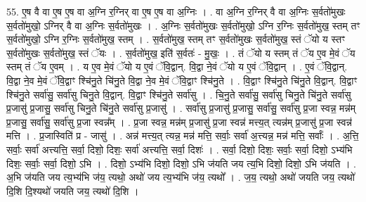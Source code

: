 \documentclass[17pt]{extarticle}
\begin{document}
55. ए॒ष वै वा ए॒ष ए॒ष वा अ॒ग्नि र॒ग्निर् वा ए॒ष ए॒ष वा अ॒ग्निः । . वा अ॒ग्नि र॒ग्निर् वै वा अ॒ग्निः स॒र्वतो॑मुखः स॒र्वतो॑मुखो॒ ऽग्निर् वै वा अ॒ग्निः स॒र्वतो॑मुखः । . अ॒ग्निः स॒र्वतो॑मुखः स॒र्वतो॑मुखो॒ ऽग्नि र॒ग्निः स॒र्वतो॑मुख॒ स्तम् तꣳ स॒र्वतो॑मुखो॒ ऽग्नि र॒ग्निः स॒र्वतो॑मुख॒ स्तम् । . स॒र्वतो॑मुख॒ स्तम् तꣳ स॒र्वतो॑मुखः स॒र्वतो॑मुख॒ स्तं ॅयो य स्तꣳ स॒र्वतो॑मुखः स॒र्वतो॑मुख॒ स्तं ॅयः । . स॒र्वतो॑मुख॒ इति॑ स॒र्वतः॑ - मु॒खः॒ । . तं ॅयो य स्तम् तं ॅय ए॒व मे॒वं ॅय स्तम् तं ॅय ए॒वम् । . य ए॒व मे॒वं ॅयो य ए॒वं ॅवि॒द्वान्. वि॒द्वा ने॒वं ॅयो य ए॒वं ॅवि॒द्वान् । . ए॒वं ॅवि॒द्वान्. वि॒द्वा ने॒व मे॒वं ॅवि॒द्वाꣳ श्चि॑नु॒ते चि॑नु॒ते वि॒द्वा ने॒व मे॒वं ॅवि॒द्वाꣳ श्चि॑नु॒ते । . वि॒द्वाꣳ श्चि॑नु॒ते चि॑नु॒ते वि॒द्वान्. वि॒द्वाꣳ श्चि॑नु॒ते सर्वा॑सु॒ सर्वा॑सु चिनु॒ते वि॒द्वान्. वि॒द्वाꣳ श्चि॑नु॒ते सर्वा॑सु । . चि॒नु॒ते सर्वा॑सु॒ सर्वा॑सु चिनु॒ते चि॑नु॒ते सर्वा॑सु प्र॒जासु॑ प्र॒जासु॒ सर्वा॑सु चिनु॒ते चि॑नु॒ते सर्वा॑सु प्र॒जासु॑ । . सर्वा॑सु प्र॒जासु॑ प्र॒जासु॒ सर्वा॑सु॒ सर्वा॑सु प्र॒जा स्वन्न॒ मन्न॑म् प्र॒जासु॒ सर्वा॑सु॒ सर्वा॑सु प्र॒जा स्वन्न᳚म् । . प्र॒जा स्वन्न॒ मन्न॑म् प्र॒जासु॑ प्र॒जा स्वन्न॑ मत्त्य॒त् त्यन्न॑म् प्र॒जासु॑ प्र॒जा स्वन्न॑ मत्ति । . प्र॒जास्विति॑ प्र - जासु॑ । . अन्न॑ मत्त्य॒त् त्यन्न॒ मन्न॑ मत्ति॒ सर्वाः॒ सर्वा॑ अ॒त्त्यन्न॒ मन्न॑ मत्ति॒ सर्वाः᳚ । . अ॒त्ति॒ सर्वाः॒ सर्वा॑ अत्त्यत्ति॒ सर्वा॒ दिशो॒ दिशः॒ सर्वा॑ अत्त्यत्ति॒ सर्वा॒ दिशः॑ । . सर्वा॒ दिशो॒ दिशः॒ सर्वाः॒ सर्वा॒ दिशो॒ ऽभ्य॑भि दिशः॒ सर्वाः॒ सर्वा॒ दिशो॒ ऽभि । . दिशो॒ ऽभ्य॑भि दिशो॒ दिशो॒ ऽभि ज॑यति जय त्य॒भि दिशो॒ दिशो॒ ऽभि ज॑यति । . अ॒भि ज॑यति जय त्य॒भ्य॑भि ज॑य॒ त्यथो॒ अथो॑ जय त्य॒भ्य॑भि ज॑य॒ त्यथो᳚ । . ज॒य॒ त्यथो॒ अथो॑ जयति जय॒ त्यथो॑ दि॒शि दि॒श्यथो॑ जयति जय॒ त्यथो॑ दि॒शि । \newline
\end{document}
